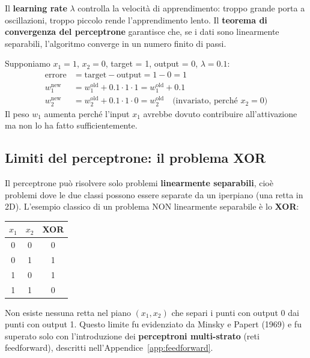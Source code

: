 \documentclass[12pt,a4paper]{article}
\begin{document}
Il \textbf{learning rate} $\lambda$ controlla la velocit\`a di apprendimento: troppo grande porta a oscillazioni, troppo piccolo rende l'apprendimento lento. Il \textbf{teorema di convergenza del perceptrone} garantisce che, se i dati sono linearmente separabili, l'algoritmo converge in un numero finito di passi.

\begin{examplebox}
Supponiamo $x_1 = 1$, $x_2 = 0$, target = 1, output = 0, $\lambda = 0.1$:
\begin{align*}
    \text{errore} &= \text{target} - \text{output} = 1 - 0 = 1 \\
    w_1^{\text{new}} &= w_1^{\text{old}} + 0.1 \cdot 1 \cdot 1 = w_1^{\text{old}} + 0.1 \\
    w_2^{\text{new}} &= w_2^{\text{old}} + 0.1 \cdot 1 \cdot 0 = w_2^{\text{old}} \quad \text{(invariato, perch\'e } x_2 = 0\text{)}
\end{align*}
Il peso $w_1$ aumenta perch\'e l'input $x_1$ avrebbe dovuto contribuire all'attivazione ma non lo ha fatto sufficientemente.
\end{examplebox}


\subsection{Limiti del perceptrone: il problema XOR}

Il perceptrone pu\`o risolvere solo problemi \textbf{linearmente separabili}, cio\`e problemi dove le due classi possono essere separate da un iperpiano (una retta in 2D). L'esempio classico di un problema NON linearmente separabile \`e lo \textbf{XOR}:

\begin{center}
\begin{tabular}{cc|c}
\toprule
$x_1$ & $x_2$ & XOR \\
\midrule
0 & 0 & 0 \\
0 & 1 & 1 \\
1 & 0 & 1 \\
1 & 1 & 0 \\
\bottomrule
\end{tabular}
\end{center}

Non esiste nessuna retta nel piano $(x_1, x_2)$ che separi i punti con output 0 dai punti con output 1. Questo limite fu evidenziato da Minsky e Papert (1969) e fu superato solo con l'introduzione dei \textbf{perceptroni multi-strato} (reti feedforward), descritti nell'Appendice~\ref{app:feedforward}.
\end{document}
